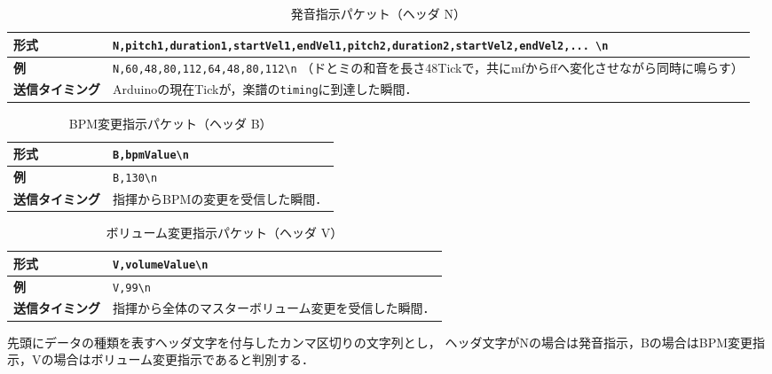\documentclass[lualatex,book,paper=a4paper,jafontsize=11.5pt,jafontscale=1.05]{jlreq}
\begin{document}
\begin{table}[H]
    \caption{発音指示パケット（ヘッダ N）}
    \label{tab:headerN}
    \centering
    \begin{tabular}{lp{10cm}}
        \hline
        \textbf{形式} & \texttt{N,pitch1,duration1,startVel1,endVel1,\newline pitch2,duration2,startVel2,endVel2,... \textbackslash n} \\ \hline
        \textbf{例} & \texttt{N,60,48,80,112,64,48,80,112\textbackslash n} \newline （ドとミの和音を長さ48Tickで，共にmfからffへ変化させながら同時に鳴らす） \\ \hline
        \textbf{送信タイミング} & Arduinoの現在Tickが，楽譜の\texttt{timing}に到達した瞬間． \\ \hline
    \end{tabular}
\end{table}

\begin{table}[H]
    \caption{BPM変更指示パケット（ヘッダ B）}
    \label{tab:headerB}
    \centering
    \begin{tabular}{lp{10cm}}
        \hline
        \textbf{形式} & \texttt{B,bpmValue\textbackslash n} \\ \hline
        \textbf{例} & \texttt{B,130\textbackslash n} \\ \hline
        \textbf{送信タイミング} & 指揮からBPMの変更を受信した瞬間． \\ \hline
    \end{tabular}
\end{table}

\begin{table}[H]
    \caption{ボリューム変更指示パケット（ヘッダ V）}
    \label{tab:headerV}
    \centering
    \begin{tabular}{lp{10cm}}
        \hline
        \textbf{形式} & \texttt{V,volumeValue\textbackslash n} \\ \hline
        \textbf{例} & \texttt{V,99\textbackslash n} \\ \hline
        \textbf{送信タイミング} & 指揮から全体のマスターボリューム変更を受信した瞬間． \\ \hline
    \end{tabular}
\end{table}

先頭にデータの種類を表すヘッダ文字を付与したカンマ区切りの文字列とし，
ヘッダ文字がNの場合は発音指示，Bの場合はBPM変更指示，Vの場合はボリューム変更指示であると判別する．
\end{document}
